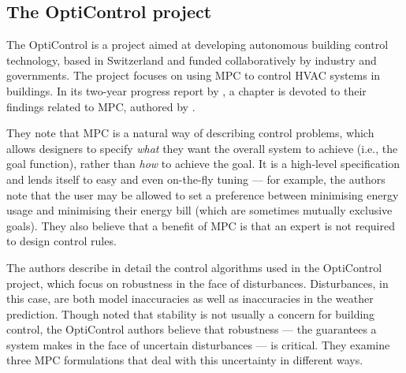 \subsection{The OptiControl project}

The OptiControl is a project aimed at developing autonomous building control technology, based in Switzerland and funded collaboratively by industry and governments.
The project focuses on using MPC to control HVAC systems in buildings.
In its two-year progress report by \textcite{Gyalistras10}, a chapter is devoted to their findings related to MPC, authored by \textcite{Oldewurtel10}.

They note that MPC is a natural way of describing control problems, which allows designers to specify \emph{what} they want the overall system to achieve (i.e., the goal function), rather than \emph{how} to achieve the goal.
It is a high-level specification\footnotemark{} and lends itself to easy and even on-the-fly tuning --- for example, the authors note that the user may be allowed to set a preference between minimising energy usage and minimising their energy bill (which are sometimes mutually exclusive goals).
They also believe that a benefit of MPC is that an expert is not required to design control rules.


The authors describe in detail the control algorithms used in the OptiControl project, which focus on robustness in the face of disturbances.
Disturbances, in this case, are both model inaccuracies as well as inaccuracies in the weather prediction.
Though  noted that stability is not usually a concern for building control, the OptiControl authors believe that robustness --- the guarantees a system makes in the face of uncertain disturbances --- is critical.
They examine three MPC formulations that deal with this uncertainty in different ways.

